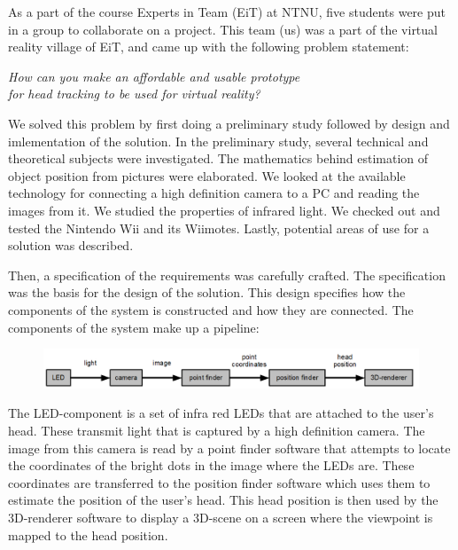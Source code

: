 As a part of the course Experts in Team (EiT) at NTNU, five students were put in a group to collaborate on a project. This team (us) was a part of the virtual reality village of EiT, and came up with the following problem statement:

\setlength{\parskip}{-0.15in}
\begin{center}
	\em How can you make an affordable and usable prototype\\
	for head tracking to be used for virtual reality?
\end{center}

We solved this problem by first doing a preliminary study followed by design and imlementation of the solution. In the preliminary study, several technical and theoretical subjects were investigated. The mathematics behind estimation of object position from pictures were elaborated. We looked at the available technology for connecting a high definition camera to a PC and reading the images from it. We studied the properties of infrared light. We checked out and tested the Nintendo Wii and its Wiimotes. Lastly, potential areas of use for a solution was described.

\setlength{\parskip}{0.1in}

Then, a specification of the requirements was carefully crafted. The specification was the basis for the design of the solution. This design specifies how the components of the system is constructed and how they are connected. The components of the system make up a pipeline:

\begin{figure}[h]
\centering
\includegraphics[width=\textwidth]{graphics/main_design_english.png}
\end{figure}

The LED-component is a set of infra red LEDs that are attached to the user's head. These transmit light that is captured by a high definition camera. The image from this camera is read by a point finder software that attempts to locate the coordinates of the bright dots in the image where the LEDs are. These coordinates are transferred to the position finder software which uses them to estimate the position of the user's head. This head position is then used by the 3D-renderer software to display a 3D-scene on a screen where the viewpoint is mapped to the head position.

